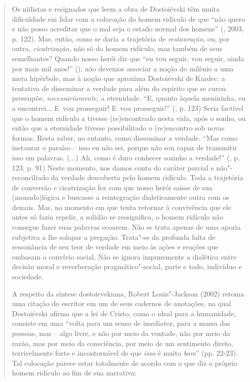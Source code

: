 {\begin{quote}
Os niilistas e resignados que leem a obra de Dostoiévski têm muita
dificuldade em lidar com a colocação do homem ridículo de que ``não
quero e não posso acreditar que o mal seja o estado normal dos homens''
(, 2003, p. 122). Mas, então, como se daria a trajetória de
\emph{restauração}, ou, por outra, \emph{cicatrização,} não só do homem
ridículo, mas também de seus semelhantes? Quando nosso herói diz que
``eu vou seguir, vou seguir, ainda por mais mil anos!'' (), não
devemos associar a noção do milênio a uma mera hipérbole, mas à noção
que aproxima Dostoiévski de Kardec: a tentativa de disseminar a verdade
para além do espírito que se curou pressupõe, \emph{necessariamente}, a
eternidade. ``E, quanto àquela menininha, eu a encontrei... E~vou
prosseguir! E~vou prosseguir!'' (, p. 123) Seria factível que o
homem ridículo a tivesse (re)encontrado nesta vida, após o sonho, ou
então que a eternidade tivesse possibilitado o (re)encontro sob novas
formas. Resta saber, no entanto, como disseminar a verdade. ``Mas como
instaurar o paraíso -- isso eu não sei, porque não sou capaz de
transmitir isso em palavras. (...) Ah, como é duro conhecer sozinho a
verdade!'' (, p. 123; p. 91) Neste momento, nos damos conta do
caráter parcial e não"-reconciliado da verdade descoberta pelo homem
ridículo. Toda a trajetória de conversão e cicatrização fez com que
nosso herói saísse de sua (monado)lógica e buscasse a reintegração
dialeticamente outra com os demais. Mas, no momento em que tenta
retornar à convivência que ele antes só fazia repelir, a solidão se
ressignifica, o homem ridículo não consegue fazer suas palavras ecoarem.
Não se trata apenas de uma aporia subjetiva a lhe solapar a pregação.
Trata"-se da profunda falta de ressonância de seu teor de verdade em meio
às ações e reações que embasam o convívio social. Não se ignora
impunemente a dialética entre decisão moral e reverberação
pragmático"-social, parte e todo, indivíduo e sociedade.

A respeito da síntese dostoievskiana, Robert Louis"-Jackson (2002) retoma
uma citação do escritor em um de seus cadernos de anotações, na qual
Dostoiévski afirma que a lei de Cristo, como o ideal para a humanidade,
consiste em uma ``volta para um senso de imediatez, para a massa das
pessoas, mas -- algo livre, e não por meio da vontade, não por meio da
razão, mas por meio da consciência, por meio de um sentimento direto,
terrivelmente forte e incontornável de que \emph{isso} é muito
\emph{bom}'' (pp. 22-23). Tal colocação parece estar totalmente de
acordo com o que diz o próprio homem ridículo ao fim de sua narrativa:


\end{quote}}
